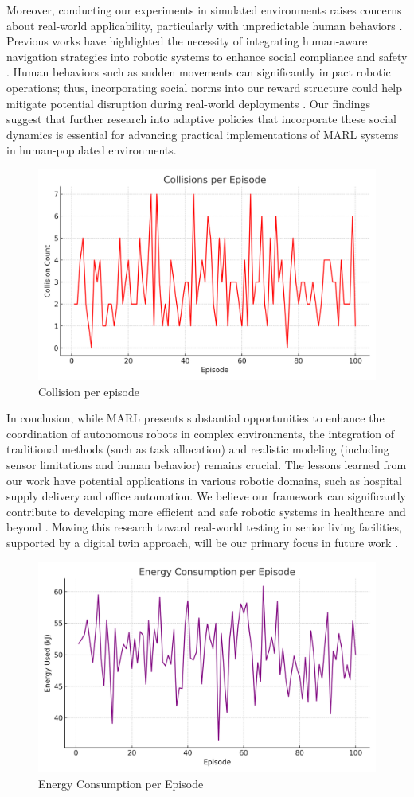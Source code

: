 \documentclass[conference]{IEEEtran}
\begin{document}
Moreover, conducting our experiments in simulated environments raises concerns about real-world applicability, particularly with unpredictable human behaviors \citep{liu2023, yang2022}. Previous works have highlighted the necessity of integrating human-aware navigation strategies into robotic systems to enhance social compliance and safety \citep{rostumi2019, yang2022}. Human behaviors such as sudden movements can significantly impact robotic operations; thus, incorporating social norms into our reward structure could help mitigate potential disruption during real-world deployments \citep{yang2022, rostumi2019}. Our findings suggest that further research into adaptive policies that incorporate these social dynamics is essential for advancing practical implementations of MARL systems in human-populated environments.
\begin{figure}
    \centering
    \includegraphics[width=0.75\linewidth]{collision_stats (1).png}
    \caption{Collision per episode}
    \label{fig:placeholder}
\end{figure}
In conclusion, while MARL presents substantial opportunities to enhance the coordination of autonomous robots in complex environments, the integration of traditional methods (such as task allocation) and realistic modeling (including sensor limitations and human behavior) remains crucial. The lessons learned from our work have potential applications in various robotic domains, such as hospital supply delivery and office automation. We believe our framework can significantly contribute to developing more efficient and safe robotic systems in healthcare and beyond \citep{ivanovic2019, schreiders2021}. Moving this research toward real-world testing in senior living facilities, supported by a digital twin approach, will be our primary focus in future work \citep{yoo2023, yoo2023a}.
\begin{figure}
    \centering
    \includegraphics[width=0.75\linewidth]{energy_usage.png}
    \caption{Energy Consumption per Episode }
    \label{fig:placeholder}
\end{figure}
\end{document}
